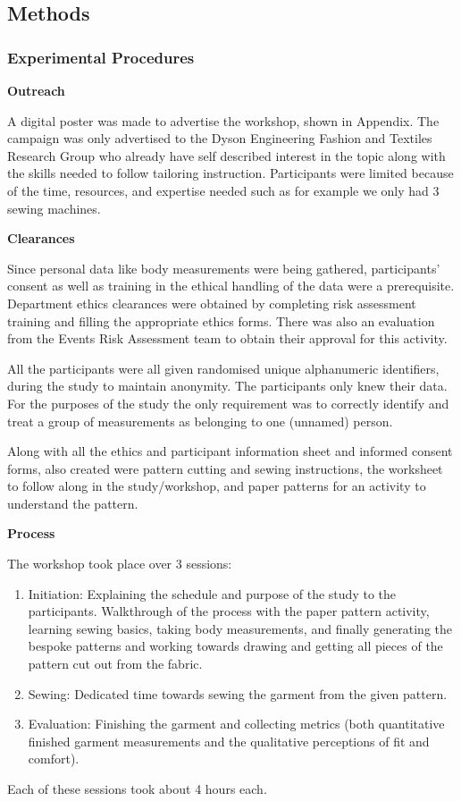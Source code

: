 \subsection{Methods}

\subsubsection{Experimental Procedures}
\noindent \textbf{Outreach}

A digital poster was made to advertise the workshop, shown in Appendix. The campaign was only advertised to the Dyson Engineering Fashion and Textiles Research Group who already have self described interest in the topic along with the skills needed to follow tailoring instruction. Participants were limited because of the time, resources, and expertise needed such as for example we only had 3 sewing machines.

\noindent \textbf{Clearances} 

Since personal data like body measurements were being gathered, participants’ consent as well as training in the ethical handling of the data were a prerequisite. Department ethics clearances were obtained by completing risk assessment training and filling the appropriate ethics forms. There was also an evaluation from the Events Risk Assessment team to obtain their approval for this activity.

All the participants were all given randomised unique alphanumeric identifiers, during the study to maintain anonymity. The participants only knew their data. For the purposes of the study the only requirement was to correctly identify and treat a group of measurements as belonging to one (unnamed) person.

Along with all the ethics and participant information sheet and informed consent forms, also created were pattern cutting and sewing instructions, the worksheet to follow along in the study/workshop, and paper patterns for an activity to understand the pattern.

\noindent \textbf{Process}

The workshop took place over 3 sessions:
\begin{enumerate}
    \item Initiation: Explaining the schedule and purpose of the study to the participants. Walkthrough of the process with the paper pattern activity, learning sewing basics, taking body measurements, and finally generating the bespoke patterns and working towards drawing and getting all pieces of the pattern cut out from the fabric.
    \item Sewing: Dedicated time towards sewing the garment from the given pattern.
    \item Evaluation: Finishing the garment and collecting metrics (both quantitative finished garment measurements and the qualitative perceptions of fit and comfort).
\end{enumerate}
Each of these sessions took about 4 hours each.


